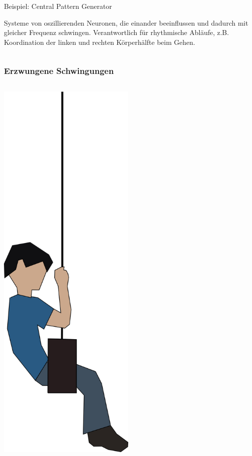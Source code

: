 \documentclass{beamer}
\begin{document}
\begin{frame}
\begin{columns}[c]
\begin{column}{7cm}
\pause

\begin{block}{Beispiel: Central Pattern Generator}

Systeme von oszillierenden Neuronen, die einander beeinflussen und dadurch mit gleicher Frequenz schwingen. Verantwortlich für rhythmische Abläufe, z.B. Koordination der linken und rechten Körperhälfte beim Gehen.

\end{block}


\end{column}

\end{columns}
\end{frame}



\begin{frame}
\frametitle{Erzwungene Schwingungen}

\begin{columns}[c]

\begin{column}{3cm}

\begin{center}
\includegraphics[width=0.5\textwidth]{kind_schaukel.png}
\end{center}


\end{column}
\end{columns}
\end{frame}
\end{document}
